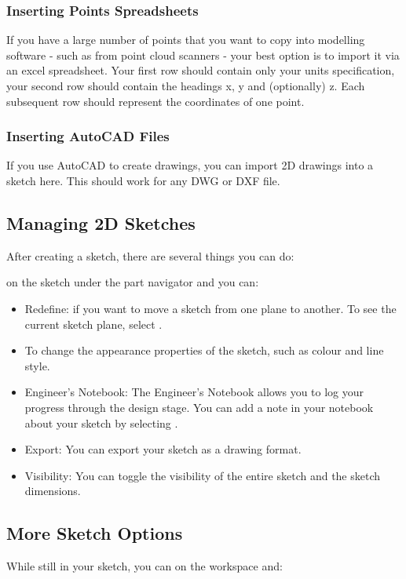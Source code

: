 \begin{enumerate}
\subsubsection{Inserting Points Spreadsheets}
If you have a large number of points that you want to copy into modelling software - such as from point cloud scanners - your best option is to import it via an excel spreadsheet. Your first row should contain only your units specification, your second row should contain the headings x, y and (optionally) z. Each subsequent row should represent the coordinates of one point.

\subsubsection{Inserting AutoCAD Files}
If you use AutoCAD to create drawings, you can import 2D drawings into a sketch here. This should work for any DWG or DXF file.

\subsection{Managing 2D Sketches}
After creating a sketch, there are several things you can do:

 on the sketch under the part navigator and you can:
\begin{itemize}
\item Redefine: if you want to move a sketch from one plane to another. To see the current sketch plane, select .
\item To change the appearance properties of the sketch, such as colour and line style.
\item Engineer's Notebook: The Engineer's Notebook allows you to log your progress through the design stage. You can add a note in your notebook about your sketch by selecting .
\item Export: You can export your sketch as a drawing format.
\item Visibility: You can toggle the visibility of the entire sketch and the sketch dimensions.
\end{itemize}

\subsection{More Sketch Options}
While still in your sketch, you can  on the workspace and:


\end{enumerate}
